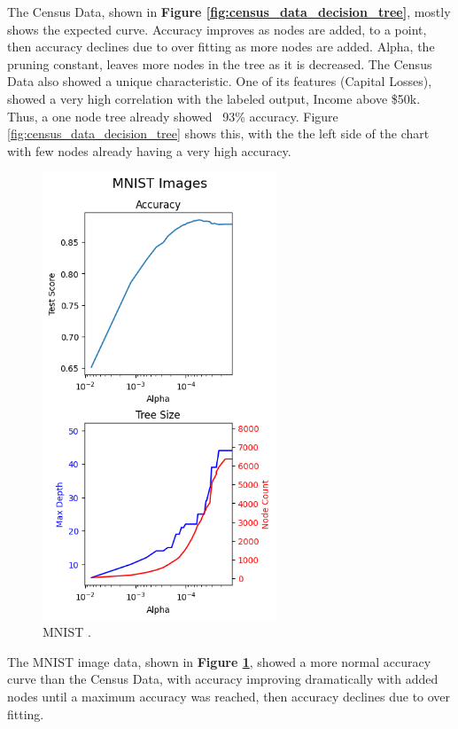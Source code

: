 \documentclass[letterpaper]{article} %
\begin{document}
The Census Data, shown in \textbf{Figure \ref{fig:census_data_decision_tree}},  mostly shows the expected curve.  Accuracy improves as nodes are added, to a point, then accuracy declines due to over fitting as more nodes are added.  Alpha, the pruning constant, leaves more nodes in the tree as it is decreased.  The Census Data also showed a unique characteristic.  One of its features (Capital Losses), showed a very high correlation with the labeled output, Income above \$50k.  Thus, a one node tree already showed ~93\% accuracy.  Figure \ref{fig:census_data_decision_tree} shows this, with the the left side of the chart with few nodes already having a very high accuracy.  

\begin{figure}[h]
\centering
\includegraphics[width=2.75in]{figures/MNIST_Images_decision_tree.png}
\caption{MNIST . }
\label{fig:MNIST_Images_decision_tree}
\end{figure}

The MNIST image data, shown in \textbf{Figure \ref{fig:MNIST_Images_decision_tree}}, showed a more normal accuracy curve than the Census Data, with accuracy improving dramatically with added nodes until a maximum accuracy was reached, then accuracy declines due to over fitting.  
\end{document}
